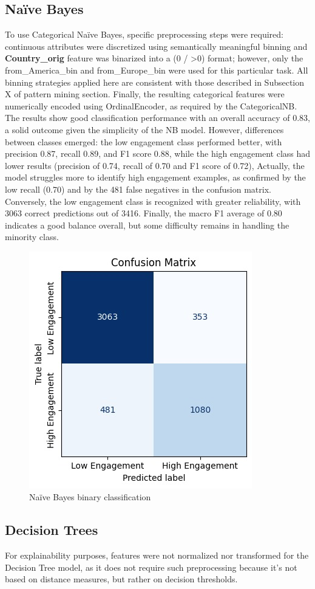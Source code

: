\subsection{Naïve Bayes}
To use Categorical Naïve Bayes, specific preprocessing steps were required: continuous attributes were discretized using semantically meaningful binning and \textbf{Country\_orig} feature was binarized into a (0 / >0) format; 
however, only the from\_America\_bin  and from\_Europe\_bin were used for this particular task. 
All binning strategies applied here are consistent with those described in Subsection X of pattern mining section. 
Finally, the resulting categorical features were numerically encoded using OrdinalEncoder, as required by the CategoricalNB.\\
The results show good classification performance with an overall accuracy of 0.83, a solid outcome given the simplicity of the NB model.
However, differences between classes emerged: the low engagement class performed better, with precision 0.87, recall 0.89, and F1 score 0.88, while the high engagement class had lower results 
(precision of 0.74, recall of 0.70 and F1 score of 0.72), 
Actually, the model struggles more to identify high engagement examples, as confirmed by the low recall (0.70) and by the 481 false negatives in the confusion matrix. 
Conversely, the low engagement class is recognized with greater reliability, with 3063 correct predictions out of 3416.
Finally, the macro F1 average of 0.80 indicates a good balance overall, but some difficulty remains in handling the minority class.
\begin{figure}[H]
    \centering
    \includegraphics[width=0.30\linewidth]{plots/nb_binary_confmatrix.jpg}
    \captionsetup{justification=centering, width=0.9\linewidth}
    \caption{Naïve Bayes binary classification}
    \label{fig:nb_binary}
\end{figure}


\subsection{Decision Trees}
For explainability purposes, features were not normalized nor transformed for the Decision Tree model,
as it does not require such preprocessing because it's not based on distance measures, but rather on
decision thresholds.\\

